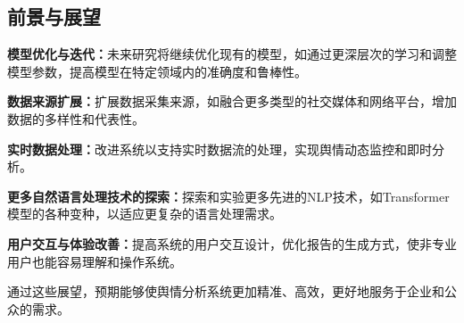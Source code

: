 \documentclass[UTF8,a4paper,15pt,titlepage,oneside]{ctexbook}
\begin{document}
\subsection{前景与展望}

\vskip 0.2cm
\noindent
\textbf{模型优化与迭代：}未来研究将继续优化现有的模型，如通过更深层次的学习和调整模型参数，提高模型在特定领域内的准确度和鲁棒性。

\vskip 0.2cm
\noindent
\textbf{数据来源扩展：}扩展数据采集来源，如融合更多类型的社交媒体和网络平台，增加数据的多样性和代表性。

\vskip 0.2cm
\noindent
\textbf{实时数据处理：}改进系统以支持实时数据流的处理，实现舆情动态监控和即时分析。

\vskip 0.2cm
\noindent
\textbf{更多自然语言处理技术的探索：}探索和实验更多先进的NLP技术，如Transformer模型的各种变种，以适应更复杂的语言处理需求。

\vskip 0.2cm
\noindent
\textbf{用户交互与体验改善：}提高系统的用户交互设计，优化报告的生成方式，使非专业用户也能容易理解和操作系统。

通过这些展望，预期能够使舆情分析系统更加精准、高效，更好地服务于企业和公众的需求。
\end{document}
